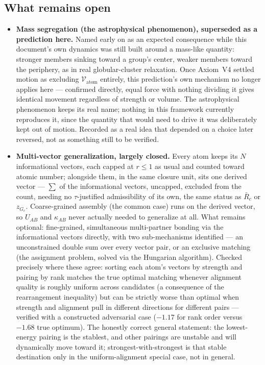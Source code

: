 \documentclass[12pt, a4paper]{article}
\begin{document}
\subsection{What remains open}
\label{subsec:assembly_open}
\begin{itemize}
\item \textbf{Mass segregation (the astrophysical phenomenon),
      superseded as a prediction here.} Named early on as an
      expected consequence while this document's own dynamics was
      still built around a mass-like quantity: stronger members
      sinking toward a group's center, weaker members toward the
      periphery, as in real globular-cluster relaxation. Once
      Axiom~V4 settled motion as excluding $\mathcal{V}_{\text
      {atom}}$ entirely, this prediction's own mechanism no longer
      applies here --- confirmed directly, equal force with nothing
      dividing it gives identical movement regardless of strength or
      volume. The astrophysical phenomenon keeps its real name;
      nothing in this framework currently reproduces it, since the
      quantity that would need to drive it was deliberately kept out
      of motion. Recorded as a real idea that depended on a choice
      later reversed, not as something still to be verified.
\item \textbf{Multi-vector generalization, largely closed.} Every
      atom keeps its $N$ informational vectors, each capped at
      $r\le 1$ as usual and counted toward atomic number; alongside
      them, in the same closure unit, sits one derived vector ---
      $\sum$ of the informational vectors, uncapped, excluded from
      the count, needing no $\tau$-justified admissibility of its
      own, the same status as $\bar R_c$ or $z_{G_c}$. Coarse-grained
      assembly (the common case) runs on the derived vector, so
      $U_{AB}$ and $\kappa_{AB}$ never actually needed to generalize
      at all. What remains optional: fine-grained, simultaneous
      multi-partner bonding via the informational vectors directly,
      with two sub-mechanisms identified --- an unconstrained double
      sum over every vector pair, or an exclusive matching (the
      assignment problem, solved via the Hungarian algorithm).
      Checked precisely where these agree: sorting each atom's
      vectors by strength and pairing by rank matches the true
      optimal matching whenever alignment quality is roughly uniform
      across candidates (a consequence of the rearrangement
      inequality) but can be strictly worse than optimal when
      strength and alignment pull in different directions for
      different pairs --- verified with a constructed adversarial
      case ($-1.17$ for rank order versus $-1.68$ true optimum). The
      honestly correct general statement: the lowest-energy pairing
      is the stablest, and other pairings are unstable and will
      dynamically move toward it; strongest-with-strongest is that
      stable destination only in the uniform-alignment special case,
      not in general.
\end{itemize}
\end{document}
